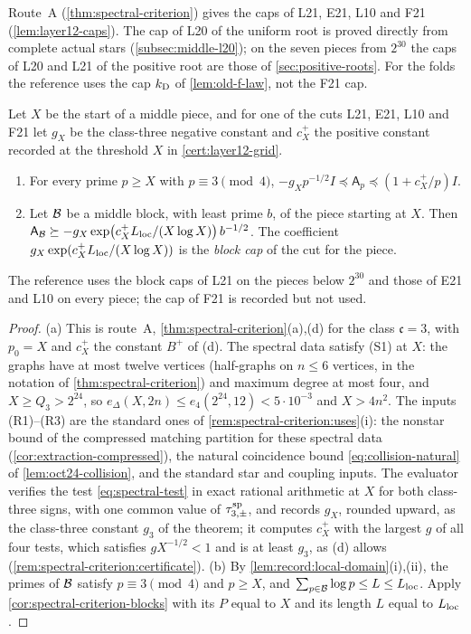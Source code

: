 Route~A (\cref{thm:spectral-criterion}) gives the caps of L21, E21, L10 and F21
(\cref{lem:layer12-caps}). The cap of L20 of the uniform root is proved directly
from complete actual stars (\cref{subsec:middle-l20}); on the seven pieces from $2^{30}$ the caps of L20 and L21 of the positive root are those of
\cref{sec:positive-roots}. For the folds the reference uses the cap $k_{\rm D}$
of \cref{lem:old-f-law}, not the F21 cap.

\begin{lemma}\label{lem:layer12-caps}
Let $X$ be the start of a middle piece, and for one of the cuts L21, E21, L10
and F21 let $g_X$ be the class-three negative constant and $c^+_X$ the positive
constant recorded at the threshold $X$ in \cref{cert:layer12-grid}.
\begin{enumerate}[label=(\alph*)]
\item For every prime $p\ge X$ with $p\equiv3\pmod4$,
 $-g_Xp^{-1/2}I\preceq\mathsf A_p\preceq(1+c^+_X/p)I$.
\item Let $\mathcal B$ be a middle block, with least prime $b$, of the piece starting
 at $X$. Then
 $\mathsf A_{\mathcal B}\succeq-g_X\exp\bigl(c^+_XL_{\rm loc}/(X\log X)\bigr)\,b^{-1/2}$.
 The coefficient $g_X\exp(c^+_XL_{\rm loc}/(X\log X))$ is the \emph{block cap}
 of the cut for the piece.
\end{enumerate}
The reference uses the block caps of L21 on the pieces below $2^{30}$ and those
of E21 and L10 on every piece; the cap of F21 is recorded but not used.
\end{lemma}

\begin{proof}
(a) This is route~A, \cref{thm:spectral-criterion}(a),(d) for the class
$\mathfrak c=3$, with $p_0=X$ and $c^+_X$ the constant $B^+$ of (d). The
spectral data satisfy (S1) at $X$: the graphs have at most twelve vertices
(half-graphs on $n\le6$ vertices, in the notation of
\cref{thm:spectral-criterion}) and maximum degree at most four, and $X\ge Q_3>2^{24}$, so
$e_\Delta(X,2n)\le e_4(2^{24},12)<5\cdot10^{-3}$ and $X>4n^2$. The inputs
(R1)--(R3) are the standard ones of \cref{rem:spectral-criterion:uses}(i): the
nonstar bound of the compressed matching partition for these spectral
data (\cref{cor:extraction-compressed}), the natural coincidence bound
\eqref{eq:collision-natural} of \cref{lem:oct24-collision}, and the standard
star and coupling inputs. The evaluator verifies the test
\eqref{eq:spectral-test} in exact rational arithmetic at $X$ for both
class-three signs, with one common value of $\tau^{\rm sp}_{3,\pm}$, and
records $g_X$, rounded upward, as the class-three constant $g_3$ of the
theorem; it computes $c^+_X$ with the largest $g$ of all four tests, which
satisfies $gX^{-1/2}<1$ and is at least $g_3$, as (d) allows
(\cref{rem:spectral-criterion:certificate}).
(b) By \cref{lem:record:local-domain}(i),(ii), the primes of $\mathcal B$ satisfy
$p\equiv3\pmod4$ and $p\ge X$, and $\sum_{p\in\mathcal B}\log p\le L\le L_{\rm loc}$.
Apply \cref{cor:spectral-criterion-blocks} with its $P$ equal to $X$ and its
length $L$ equal to $L_{\rm loc}$.
\end{proof}

